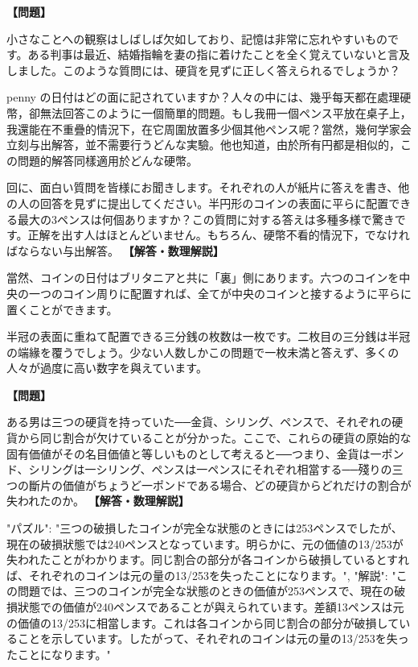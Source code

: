 \documentclass[10pt,a4paper,oneside,openany]{ltjsbook}
\begin{document}
\begin{tcolorbox}[colback=softblue,colframe=primaryblue,title=\textbf{第 28 問：DEFECTIVE OBSERVATION.},arc=2mm,boxrule=1pt,breakable]
\textbf{【問題】}\par\vspace{0.3em}
小さなことへの観察はしばしば欠如しており、記憶は非常に忘れやすいものです。ある判事は最近、結婚指輪を妻の指に着けたことを全く覚えていないと言及しました。このような質問には、硬貨を見ずに正しく答えられるでしょうか？

 penny の日付はどの面に記されていますか？人々の中には、幾乎每天都在處理硬幣，卻無法回答このように一個簡單的問題。もし我冊一個ペンス平放在桌子上，我還能在不重疊的情況下，在它周圍放置多少個其他ペンス呢？當然，幾何学家会立刻与出解答，並不需要行うどんな実驗。他也知道，由於所有円都是相似的，この問題的解答同樣適用於どんな硬幣。

回に、面白い質問を皆様にお聞きします。それぞれの人が紙片に答えを書き、他の人の回答を見ずに提出してください。半円形のコインの表面に平らに配置できる最大の3ペンスは何個ありますか？この質問に対する答えは多種多様で驚きです。正解を出す人はほとんどいません。もちろん、硬幣不看的情況下，でなければならない与出解答。
\tcblower
\textbf{【解答・数理解説】}\par\vspace{0.3em}
當然、コインの日付はブリタニアと共に「裏」側にあります。六つのコインを中央の一つのコイン周りに配置すれば、全てが中央のコインと接するように平らに置くことができます。

半冠の表面に重ねて配置できる三分銭の枚数は一枚です。二枚目の三分銭は半冠の端緣を覆うでしょう。少ない人数しかこの問題で一枚未満と答えず、多くの人々が過度に高い数字を與えています。
\end{tcolorbox}

\begin{tcolorbox}[colback=softblue,colframe=primaryblue,title=\textbf{第 29 問：THE BROKEN COINS.},arc=2mm,boxrule=1pt,breakable]
\textbf{【問題】}\par\vspace{0.3em}
ある男は三つの硬貨を持っていた──金貨、シリング、ペンスで、それぞれの硬貨から同じ割合が欠けていることが分かった。ここで、これらの硬貨の原始的な固有価値がその名目価値と等しいものとして考えると──つまり、金貨は一ポンド、シリングは一シリング、ペンスは一ペンスにそれぞれ相當する──殘りの三つの斷片の価値がちょうど一ポンドである場合、どの硬貨からどれだけの割合が失われたのか。
\tcblower
\textbf{【解答・数理解説】}\par\vspace{0.3em}
{
"パズル": "三つの破損したコインが完全な狀態のときには253ペンスでしたが、現在の破損狀態では240ペンスとなっています。明らかに、元の価値の13/253が失われたことがわかります。同じ割合の部分が各コインから破損しているとすれば、それぞれのコインは元の量の13/253を失ったことになります。",
"解説": "この問題では、三つのコインが完全な狀態のときの価値が253ペンスで、現在の破損狀態での価値が240ペンスであることが與えられています。差額13ペンスは元の価値の13/253に相當します。これは各コインから同じ割合の部分が破損していることを示しています。したがって、それぞれのコインは元の量の13/253を失ったことになります。"
}
\end{tcolorbox}
\end{document}
